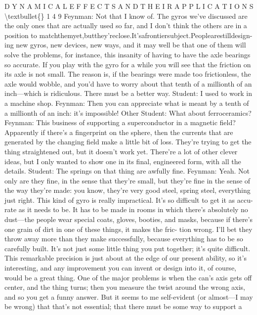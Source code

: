 \documentclass[10pt,oneside]{article}
\begin{document}
D Y N A M I C A L  E F F E C T S  A N D  T H E I R  A P P L I C A T I O N S \textbackslash{}textbullet\{\} 1 4 9 Feynman: Not that I know of. The gyros we’ve discussed are the only ones that are actually used so far, and I don’t think the others are in a position to matchthemyet,butthey’reclose.It’safrontiersubject.Peoplearestilldesign- ing new gyros, new devices, new ways, and it may well be that one of them will solve the problems, for instance, this insanity of having to have the axle bearings so accurate. If you play with the gyro for a while you will see that the friction on its axle is not small. The reason is, if the bearings were made too frictionless, the axle would wobble, and you’d have to worry about that tenth of a millionth of an inch---which is ridiculous. There must be a better way. Student: I used to work in a machine shop. Feynman: Then you can appreciate what is meant by a tenth of a millionth of an inch: it’s impossible! Other Student: What about ferroceramics? Feynman: This business of supporting a superconductor in a magnetic field? Apparently if there’s a fingerprint on the sphere, then the currents that are generated by the changing field make a little bit of loss. They’re trying to get the thing straightened out, but it doesn’t work yet. There’re a lot of other clever ideas, but I only wanted to show one in its final, engineered form, with all the details. Student: The springs on that thing are awfully fine. Feynman: Yeah. Not only are they fine, in the sense that they’re small, but they’re fine in the sense of the way they’re made: you know, they’re very good steel, spring steel, everything just right. This kind of gyro is really impractical. It’s so difficult to get it as accu- rate as it needs to be. It has to be made in rooms in which there’s absolutely no dust---the people wear special coats, gloves, booties, and masks, because if there’s one grain of dirt in one of these things, it makes the fric- tion wrong. I’ll bet they throw away more than they make successfully, because everything has to be so carefully built. It’s not just some little thing you put together; it’s quite difficult. This remarkable precision is just about at the edge of our present ability, so it’s interesting, and any improvement you can invent or design into it, of course, would be a great thing. One of the major problems is when the can’s axis gets off center, and the thing turns; then you measure the twist around the wrong axis, and so you get a funny answer. But it seems to me self-evident (or almost---I may be wrong) that that’s not essential; that there must be some way to support a\par
\end{document}
